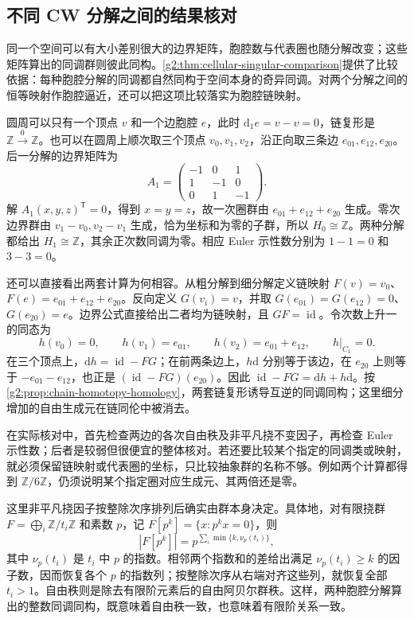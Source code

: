 \subsection{不同 CW 分解之间的结果核对}
\label{g2:subsec:0304:04}

同一个空间可以有大小差别很大的边界矩阵，胞腔数与代表圈也随分解改变；这些矩阵算出的同调群则彼此同构。\cref{g2:thm:cellular-singular-comparison}提供了比较依据：每种胞腔分解的同调都自然同构于空间本身的奇异同调。对两个分解之间的恒等映射作胞腔逼近，还可以把这项比较落实为胞腔链映射。

\begin{example}\label{g2:exm:circle-cell-decompositions}
	圆周可以只有一个顶点 \(v\) 和一个边胞腔 \(e\)，此时 \(\mathrm{d}_1e=v-v=0\)，链复形是 \(\mathbb Z\xrightarrow{0}\mathbb Z\)。也可以在圆周上顺次取三个顶点 \(v_0,v_1,v_2\)，沿正向取三条边 \(e_{01},e_{12},e_{20}\)。后一分解的边界矩阵为
	\[
		A_1=\begin{pmatrix}-1&0&1\\1&-1&0\\0&1&-1\end{pmatrix}.
	\]
	解 \(A_1(x,y,z)^{\mathsf T}=0\)，得到 \(x=y=z\)，故一次圈群由 \(e_{01}+e_{12}+e_{20}\) 生成。零次边界群由 \(v_1-v_0,v_2-v_1\) 生成，恰为坐标和为零的子群，所以 \(H_0\cong\mathbb Z\)。两种分解都给出 \(H_1\cong\mathbb Z\)，其余正次数同调为零。相应 Euler 示性数分别为 \(1-1=0\) 和 \(3-3=0\)。

	还可以直接看出两套计算为何相容。从粗分解到细分解定义链映射 \(F(v)=v_0\)、\(F(e)=e_{01}+e_{12}+e_{20}\)。反向定义 \(G(v_i)=v\)，并取 \(G(e_{01})=G(e_{12})=0\)、\(G(e_{20})=e\)。边界公式直接给出二者均为链映射，且 \(GF=\operatorname{id}\)。令次数上升一的同态为
	\[
		h(v_0)=0,\qquad h(v_1)=e_{01},\qquad
		h(v_2)=e_{01}+e_{12},\qquad h|_{C_1}=0.
	\]
	在三个顶点上，\(\mathrm{d}h=\operatorname{id}-FG\)；在前两条边上，\(h\mathrm{d}\) 分别等于该边，在 \(e_{20}\) 上则等于 \(-e_{01}-e_{12}\)，也正是 \((\operatorname{id}-FG)(e_{20})\)。因此 \(\operatorname{id}-FG=\mathrm{d}h+h\mathrm{d}\)。按\cref{g2:prop:chain-homotopy-homology}，两套链复形诱导互逆的同调同构；这里细分增加的自由生成元在链同伦中被消去。
\end{example}

在实际核对中，首先检查两边的各次自由秩及非平凡挠不变因子，再检查 Euler 示性数；后者是较弱但很便宜的整体核对。若还要比较某个指定的同调类或映射，就必须保留链映射或代表圈的坐标，只比较抽象群的名称不够。例如两个计算都得到 \(\mathbb Z/6\mathbb Z\)，仍须说明某个指定圈对应生成元、其两倍还是零。

\ProseParagraphBreak

这里非平凡挠因子按整除次序排列后确实由群本身决定。具体地，对有限挠群 \(F=\bigoplus_i\mathbb Z/t_i\mathbb Z\) 和素数 \(p\)，记 \(F[p^k]=\{x:p^kx=0\}\)，则
\[
	|F[p^k]|=p^{\sum_i\min\{k,\nu_p(t_i)\}},
\]
其中 \(\nu_p(t_i)\) 是 \(t_i\) 中 \(p\) 的指数。相邻两个指数和的差给出满足 \(\nu_p(t_i)\ge k\) 的因子数，因而恢复各个 \(p\) 的指数列；按整除次序从右端对齐这些列，就恢复全部 \(t_i>1\)。自由秩则是除去有限阶元素后的自由阿贝尔群秩。这样，两种胞腔分解算出的整数同调同构，既意味着自由秩一致，也意味着有限阶关系一致。

